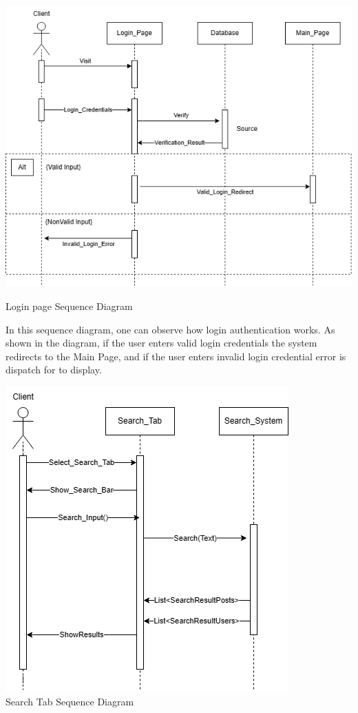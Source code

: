 \begin{center}
    \includegraphics[scale = 0.8]{SequenceDiagram_LoginPage.png}
    \caption{Login page Sequence Diagram}
\end{center}

In this sequence diagram, one can observe how login authentication works. As shown in the diagram, if the user enters valid  login credentials the system redirects to the Main Page, and if the user enters invalid login credential error is dispatch for to display.

\begin{center}    
    \includegraphics[scale = 1]{SequenceDiagram_SearchTab.png}\\
    \caption{Search Tab Sequence Diagram}
\end{center}

